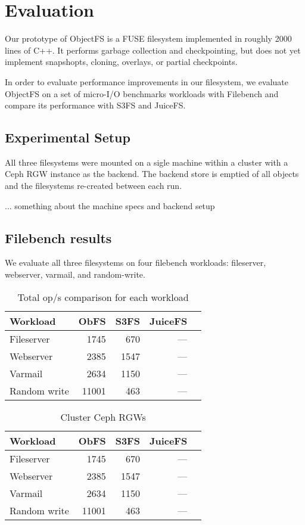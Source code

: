 \section{Evaluation}
\label{sec:evaluation}

Our prototype of ObjectFS is a FUSE filesystem implemented in roughly 2000
lines of C++. It performs garbage collection and checkpointing, but does not
yet implement snapshopts, cloning, overlays, or partial checkpoints.

In order to evaluate performance improvements in our filesystem, we evaluate
ObjectFS on a set of micro-I/O benchmarks workloads with Filebench
\citep{filebench} and compare its performance with S3FS and JuiceFS.

\subsection{Experimental Setup}

All three filesystems were mounted on a sigle machine within a cluster with a
Ceph RGW instance as the backend. The backend store is emptied of all objects
and the filesystems re-created between each run.

... something about the machine specs and backend setup

\subsection{Filebench results}

We evaluate all three filesystems on four filebench workloads: fileserver,
webserver, varmail, and random-write.

\begin{table}
	\caption{Total op/s comparison for each workload}
	\label{dataset}
	\centering
	\begin{tabular}{lrrrr}
		\toprule
		Workload     & ObFS  & S3FS & JuiceFS \\
		\midrule
		Fileserver   & 1745  & 670  & ---     \\
		Webserver    & 2385  & 1547 & ---     \\
		Varmail      & 2634  & 1150 & ---     \\
		Random write & 11001 & 463  & ---     \\
		\bottomrule
	\end{tabular}
\end{table}

\begin{table}
	\caption{Cluster Ceph RGWs}
	\label{rgws}
	\centering
	\begin{tabular}{lrrrr}
		\toprule
		Workload     & ObFS  & S3FS & JuiceFS \\
		\midrule
		Fileserver   & 1745  & 670  & ---     \\
		Webserver    & 2385  & 1547 & ---     \\
		Varmail      & 2634  & 1150 & ---     \\
		Random write & 11001 & 463  & ---     \\
		\bottomrule
	\end{tabular}
\end{table}






